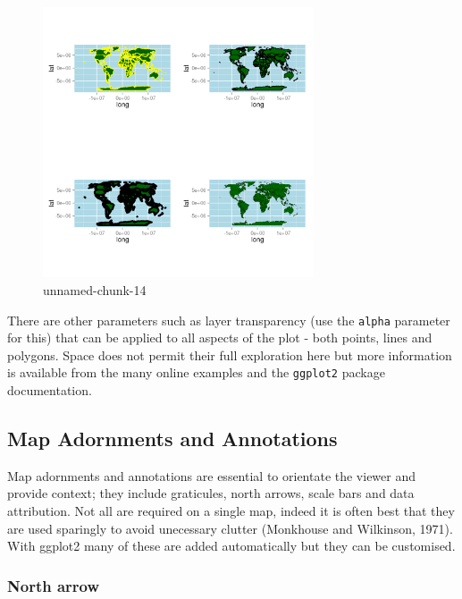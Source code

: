 \documentclass[]{article}
\let\Oldincludegraphics\includegraphics
\renewcommand{\includegraphics}[1]{\Oldincludegraphics[width=8cm]{#1}}
\begin{document}
\begin{figure}[htbp]
\centering
\includegraphics{figure/unnamed-chunk-14.png}
\caption{unnamed-chunk-14}
\end{figure}

There are other parameters such as layer transparency (use the
\texttt{alpha} parameter for this) that can be applied to all aspects of
the plot - both points, lines and polygons. Space does not permit their
full exploration here but more information is available from the many
online examples and the \texttt{ggplot2} package documentation.

\subsection{Map Adornments and Annotations}

Map adornments and annotations are essential to orientate the viewer and
provide context; they include graticules, north arrows, scale bars and
data attribution. Not all are required on a single map, indeed it is
often best that they are used sparingly to avoid unecessary clutter
(Monkhouse and Wilkinson, 1971). With ggplot2 many of these are added
automatically but they can be customised.

\subsubsection{North arrow}
\end{document}
